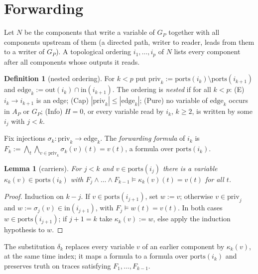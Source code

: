 \documentclass[10pt]{article}
\theoremstyle{plain}\newtheorem{theorem}{Theorem}\newtheorem{lemma}{Lemma}
\theoremstyle{definition}\newtheorem{definition}{Definition}
\newcommand{\inp}{\mathrm{in}}\newcommand{\outp}{\mathrm{out}}\newcommand{\ports}{\mathrm{ports}}\newcommand{\priv}{\mathrm{priv}}\newcommand{\edge}{\mathrm{edge}}
\begin{document}
\section{Forwarding}
Let $N$ be the components that write a variable of $G_P$ together with all components upstream of them (a directed path, writer to reader, leads from them to a writer of $G_P$). A topological ordering $i_1,\dots,i_p$ of $N$ lists every component after all components whose outputs it reads.
\begin{definition}[nested ordering]
For $k<p$ put $\priv_k:=\ports(i_k)\setminus\ports(i_{k+1})$ and $\edge_k:=\outp(i_k)\cap\inp(i_{k+1})$. The ordering is \emph{nested} if for all $k<p$: (E) $i_k\to i_{k+1}$ is an edge; (Cap) $|\priv_k|\le|\edge_k|$; (Pure) no variable of $\edge_k$ occurs in $A_P$ or $G_P$; (Info) $H=0$, or every variable read by $i_k$, $k\ge2$, is written by some $i_j$ with $j<k$.
\end{definition}
Fix injections $\sigma_k:\priv_k\to\edge_k$. The \emph{forwarding formula} of $i_k$ is $F_k:=\bigwedge_{t}\bigwedge_{v\in\priv_k}\sigma_k(v)(t)=v(t)$, a formula over $\ports(i_k)$.
\begin{lemma}[carriers]\label{lem:carry}
For $j<k$ and $v\in\ports(i_j)$ there is a variable $\kappa_k(v)\in\ports(i_k)$ with $F_j\wedge\dots\wedge F_{k-1}\models\kappa_k(v)(t)=v(t)$ for all $t$.
\end{lemma}
\begin{proof}
Induction on $k-j$. If $v\in\ports(i_{j+1})$, set $w:=v$; otherwise $v\in\priv_j$ and $w:=\sigma_j(v)\in\inp(i_{j+1})$, with $F_j\models w(t)=v(t)$. In both cases $w\in\ports(i_{j+1})$; if $j+1=k$ take $\kappa_k(v):=w$, else apply the induction hypothesis to $w$.
\end{proof}
The substitution $\delta_k$ replaces every variable $v$ of an earlier component by $\kappa_k(v)$, at the same time index; it maps a formula to a formula over $\ports(i_k)$ and preserves truth on traces satisfying $F_1,\dots,F_{k-1}$.
\end{document}
